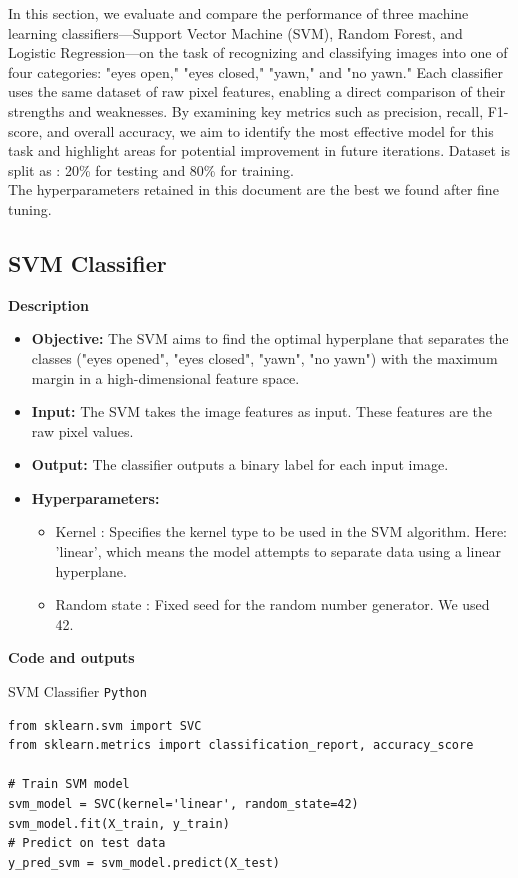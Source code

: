 \documentclass{modeleRapport}
\begin{document}
In this section, we evaluate and compare the performance of three machine learning classifiers—Support Vector Machine (SVM), Random Forest, and Logistic Regression—on the task of recognizing and classifying images into one of four categories: "eyes open," "eyes closed," "yawn," and "no yawn." Each classifier uses the same dataset of raw pixel features, enabling a direct comparison of their strengths and weaknesses. By examining key metrics such as precision, recall, F1-score, and overall accuracy, we aim to identify the most effective model for this task and highlight areas for potential improvement in future iterations. Dataset is split as : 20\% for testing and 80\% for training.
\\The hyperparameters retained in this document are the best we found after fine tuning.
\subsection{SVM Classifier}

\bigskip

\textbf{Description}

\begin{itemize}
    \item \textbf{Objective:} The SVM aims to find the optimal hyperplane that separates the classes ("eyes opened", "eyes closed", "yawn", "no yawn") with the maximum margin in a high-dimensional feature space.

    \item \textbf{Input:} The SVM takes the image features as input. These features are the raw pixel values.

    \item \textbf{Output:} The classifier outputs a binary label for each input image.

    \item \textbf{Hyperparameters:}
    \begin{itemize}
        \item Kernel : Specifies the kernel type to be used in the SVM algorithm. Here: 'linear', which means the model attempts to separate data using a linear hyperplane.
        \item Random state : Fixed seed for the random number generator. We used 42.
    \end{itemize}
\end{itemize}

\textbf{Code and outputs}
\begin{codebox}{SVM Classifier \texttt{Python}}
\begin{lstlisting}
from sklearn.svm import SVC
from sklearn.metrics import classification_report, accuracy_score

# Train SVM model
svm_model = SVC(kernel='linear', random_state=42)
svm_model.fit(X_train, y_train)
# Predict on test data
y_pred_svm = svm_model.predict(X_test)
\end{lstlisting}
\end{codebox}
\end{document}
